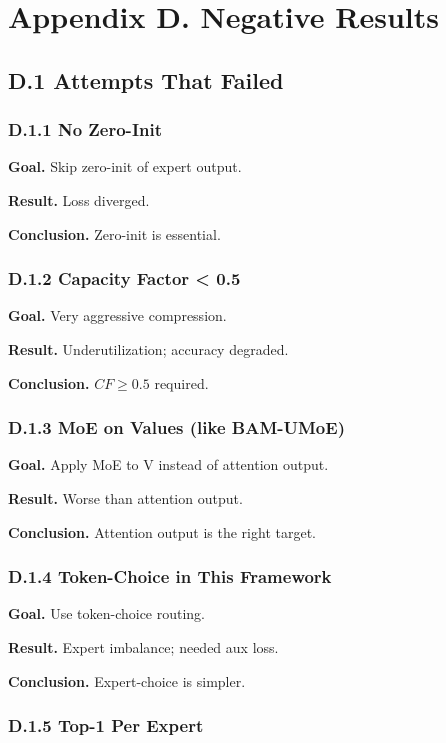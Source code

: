\section{Appendix D. Negative Results}

\subsection{D.1 Attempts That Failed}

\subsubsection{D.1.1 No Zero-Init}

\textbf{Goal.} Skip zero-init of expert output.

\textbf{Result.} Loss diverged.

\textbf{Conclusion.} Zero-init is essential.

\subsubsection{D.1.2 Capacity Factor \textless{} 0.5}

\textbf{Goal.} Very aggressive compression.

\textbf{Result.} Underutilization; accuracy degraded.

\textbf{Conclusion.} $CF \geq 0.5$ required.

\subsubsection{D.1.3 MoE on Values (like BAM-UMoE)}

\textbf{Goal.} Apply MoE to V instead of attention output.

\textbf{Result.} Worse than attention output.

\textbf{Conclusion.} Attention output is the right target.

\subsubsection{D.1.4 Token-Choice in This Framework}

\textbf{Goal.} Use token-choice routing.

\textbf{Result.} Expert imbalance; needed aux loss.

\textbf{Conclusion.} Expert-choice is simpler.

\subsubsection{D.1.5 Top-1 Per Expert}

